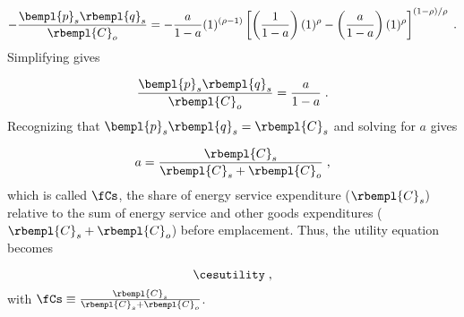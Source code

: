 \begin{equation}
  - \frac{\bempl{p}_s \rbempl{q}_s}{\rbempl{C}_o} =
        -\frac{a}{1 - a} (1)^{(\rho -1)}
        \left[ \left( \frac{1}{1 - a} \right) (1)^\rho
                - \left( \frac{a}{1 - a} \right) 
                          (1)^\rho \right]^{(1 - \rho)/\rho} \; .
\end{equation}
%
Simplifying gives

\begin{equation}
  \frac{\bempl{p}_s \rbempl{q}_s}{\rbempl{C}_o} = \frac{a}{1 - a} \; .
\end{equation}
%
Recognizing that $\bempl{p}_s \rbempl{q}_s = \rbempl{C}_s$ and solving for
$a$ gives

\begin{equation}
  a = \frac{\rbempl{C}_s}{\rbempl{C}_s + \rbempl{C}_o} \; ,
\end{equation}
%
which is called $\fCs$, 
the share of energy service expenditure ($\rbempl{C}_s$) 
relative to the sum of energy service and other goods expenditures 
($\rbempl{C}_s + \rbempl{C}_o$) 
before emplacement.
Thus, the utility equation becomes

\begin{equation} \label{eq:ces_utility}
  \cesutility \; ,
\end{equation}
%
with $\fCs \equiv \frac{\rbempl{C}_s}{\rbempl{C}_s + \rbempl{C}_o}$.


